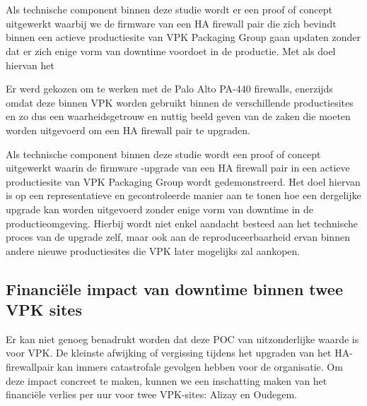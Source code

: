 \chapter{}%
\label{ch:poc}

Als technische component binnen deze studie wordt er een proof of concept uitgewerkt waarbij we de firmware van een HA firewall pair die zich bevindt binnen een actieve productiesite van VPK Packaging Group gaan updaten zonder dat er zich enige vorm van downtime voordoet in de productie. Met als doel hiervan het 

Er werd gekozen om te werken met de Palo Alto PA-440 firewalls, enerzijds omdat deze binnen VPK worden gebruikt binnen de verschillende productiesites en zo dus een waarheidsgetrouw en nuttig beeld geven van de zaken die moeten worden uitgevoerd om een HA firewall pair te upgraden.

Als technische component binnen deze studie wordt een proof of concept uitgewerkt waarin de firmware -upgrade van een HA firewall pair in een actieve productiesite van VPK Packaging Group wordt gedemonstreerd. Het doel hiervan is op een representatieve en gecontroleerde manier aan te tonen hoe een dergelijke upgrade kan worden uitgevoerd zonder enige vorm van downtime in de productieomgeving. Hierbij wordt niet enkel aandacht besteed aan het technische proces van de upgrade zelf, maar ook aan de reproduceerbaarheid ervan binnen andere nieuwe productiesites die VPK later mogelijks zal aankopen.


\section{Financiële impact van downtime binnen twee VPK sites}
Er kan niet genoeg benadrukt worden dat deze POC van uitzonderlijke waarde is voor VPK. De kleinste afwijking of vergissing tijdens het upgraden van het HA-firewallpair kan immers catastrofale gevolgen hebben voor de organisatie. Om deze impact concreet te maken, kunnen we een inschatting maken van het financiële verlies per uur voor twee VPK-sites: Alizay en Oudegem.



\vspace{5mm}
\begin{table}[h!]
    \centering
    \caption{Overzicht van financiële parameters voor VPK Alizay en VPK Oudegem.}
    \label{fig:VPKsites}
\end{table}


